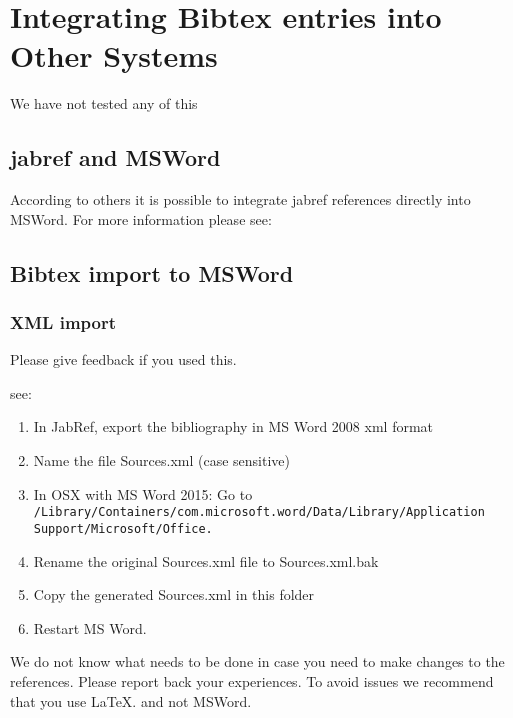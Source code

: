 \section{Integrating Bibtex entries into Other Systems}

We have not tested any of this

\subsection{jabref and MSWord}

According to others it is possible to integrate jabref references
directly into MSWord. 
For more information please see:


\subsection{Bibtex import to MSWord}\label{bibtex-import-to-msword}

\subsubsection{XML import}

Please give feedback if you used this.

see:

\begin{enumerate}

\item  In JabRef, export the bibliography in MS Word 2008 xml format

\item  Name the file Sources.xml (case sensitive)
\item   In OSX with MS Word 2015: Go to
  \verb|/Library/Containers/com.microsoft.word/Data/Library/Application Support/Microsoft/Office.|
\item  Rename the original Sources.xml file to Sources.xml.bak
\item  Copy the generated Sources.xml in this folder
\item  Restart MS Word.

\end{enumerate}

We do not know what needs to be done in case you need to make changes to
the references. Please report back your experiences. To avoid issues we
recommend that you use LaTeX. and not MSWord.

